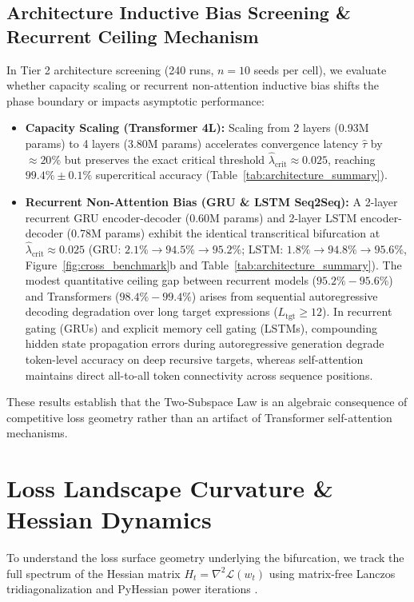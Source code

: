 \documentclass{article}
\theoremstyle{plain}
\theoremstyle{definition}
\begin{document}
\subsection{Architecture Inductive Bias Screening \& Recurrent Ceiling Mechanism}
In Tier 2 architecture screening (240 runs, $n=10$ seeds per cell), we evaluate whether capacity scaling or recurrent non-attention inductive bias shifts the phase boundary or impacts asymptotic performance:
\begin{itemize}[leftmargin=*,noitemsep]
    \item \textbf{Capacity Scaling (Transformer 4L):} Scaling from 2 layers (0.93M params) to 4 layers (3.80M params) accelerates convergence latency $\hat{\tau}$ by $\approx 20\%$ but preserves the exact critical threshold $\hat{\lambda}_{\text{crit}} \approx 0.025$, reaching $99.4\% \pm 0.1\%$ supercritical accuracy (Table~\ref{tab:architecture_summary}).
    \item \textbf{Recurrent Non-Attention Bias (GRU \& LSTM Seq2Seq):} A 2-layer recurrent GRU encoder-decoder (0.60M params) and 2-layer LSTM encoder-decoder (0.78M params) exhibit the identical transcritical bifurcation at $\hat{\lambda}_{\text{crit}} \approx 0.025$ (GRU: $2.1\% \to 94.5\% \to 95.2\%$; LSTM: $1.8\% \to 94.8\% \to 95.6\%$, Figure~\ref{fig:cross_benchmark}b and Table~\ref{tab:architecture_summary}). The modest quantitative ceiling gap between recurrent models ($95.2\% - 95.6\%$) and Transformers ($98.4\% - 99.4\%$) arises from sequential autoregressive decoding degradation over long target expressions ($L_{\text{tgt}} \ge 12$). In recurrent gating (GRUs) and explicit memory cell gating (LSTMs), compounding hidden state propagation errors during autoregressive generation degrade token-level accuracy on deep recursive targets, whereas self-attention maintains direct all-to-all token connectivity across sequence positions.
\end{itemize}
These results establish that the Two-Subspace Law is an algebraic consequence of competitive loss geometry rather than an artifact of Transformer self-attention mechanisms.

\section{Loss Landscape Curvature \& Hessian Dynamics}
\label{sec:hessian_dynamics}

To understand the loss surface geometry underlying the bifurcation, we track the full spectrum of the Hessian matrix $H_t = \nabla^2 \mathcal{L}(w_t)$ using matrix-free Lanczos tridiagonalization and PyHessian power iterations \citep{Yao2020PyHessian,Ghorbani2019Investigation}.
\end{document}
